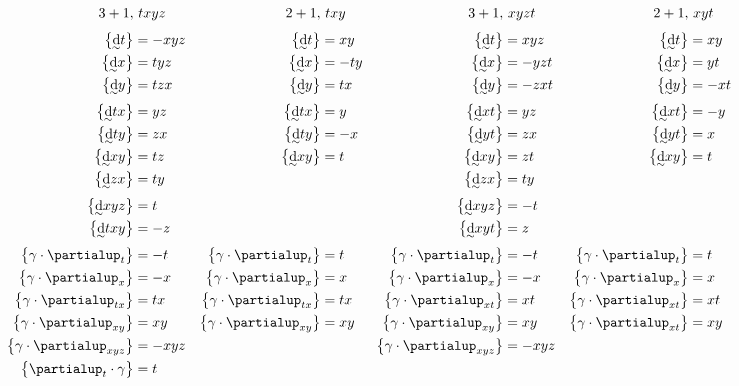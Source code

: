 \documentclass[\ifafour a4paper,12pt,\else a5paper,10pt,\fi%
onecolumn,oneside,article,%
british%
]{memoir}
\theoremstyle{remark}
\theoremstyle{innote}
\newcommand*{\de}{\partialup}%
\newcommand*{\di}{\mathrm{d}}%
\DeclarePairedDelimiter\set{\{}{\}} %
\renewcommand*{\|}[1][]{\nonscript\:#1\vert\nonscript\:\mathopen{}}
\newcommand*{\tw}[2][\scriptstyle\sim]{\smash[b]{\underset{\mathclap{{}^{#1}}}{#2}}}
\newcommand*{\ti}[1][\scriptstyle\sim]{\tw[#1]{\di}}
\begin{document}
\begin{equation}
  \label{eq:table_orientation}
  \begin{aligned}
    3+1,&\ txyz &    2+1,&\ txy &
    3+1,&\ xyzt &    2+1,&\ xyt 
\\[\jot]
    \set[\big]{\ti t} &= -xyz & \set[\big]{\ti t} &= xy &
    \set[\big]{\ti t} &= xyz & \set[\big]{\ti t} &= xy 
\\
    \set[\big]{\ti x} &= tyz & \set[\big]{\ti x} &= -ty &
    \set[\big]{\ti x} &= -yzt & \set[\big]{\ti x} &= yt 
\\
    \set[\big]{\ti y} &= tzx & \set[\big]{\ti y} &= tx &
    \set[\big]{\ti y} &= -zxt & \set[\big]{\ti y} &= -xt 
\\[\jot]
    \set[\big]{\ti tx} &= yz & \set[\big]{\ti tx} &= y &
    \set[\big]{\ti xt} &= yz & \set[\big]{\ti xt} &= -y 
\\
    \set[\big]{\ti ty} &= zx & \set[\big]{\ti ty} &= -x &
    \set[\big]{\ti yt} &= zx & \set[\big]{\ti yt} &= x 
\\
    \set[\big]{\ti xy } &= tz & \set[\big]{\ti xy } &= t &
    \set[\big]{\ti xy } &= zt & \set[\big]{\ti xy } &= t 
\\
    \set[\big]{\ti zx } &= ty & & &
    \set[\big]{\ti zx } &= ty & & 
\\[\jot]
    \set[\big]{\ti xyz}&=t & & &
    \set[\big]{\ti xyz}&=-t & & 
\\
    \set[\big]{\ti txy}&=-z & & &
    \set[\big]{\ti xyt}&=z & & 
\\[\jot]
    \set[\big]{\gamma\cdot\de_{t}} &= -t &
    \set[\big]{\gamma\cdot\de_{t}} &= t &
    \set[\big]{\gamma\cdot\de_{t}} &= -t &
    \set[\big]{\gamma\cdot\de_{t}} &= t 
\\
    \set[\big]{\gamma\cdot\de_{x}} &= -x &
    \set[\big]{\gamma\cdot\de_{x}} &= x &
    \set[\big]{\gamma\cdot\de_{x}} &= -x &
    \set[\big]{\gamma\cdot\de_{x}} &= x 
\\
    \set[\big]{\gamma\cdot\de_{tx}} &= tx &
    \set[\big]{\gamma\cdot\de_{tx}} &= tx &
    \set[\big]{\gamma\cdot\de_{xt}} &= xt &
    \set[\big]{\gamma\cdot\de_{xt}} &= xt 
\\
    \set[\big]{\gamma\cdot\de_{xy}} &= xy &
    \set[\big]{\gamma\cdot\de_{xy}} &= xy &
    \set[\big]{\gamma\cdot\de_{xy}} &= xy &
    \set[\big]{\gamma\cdot\de_{xt}} &= xy 
\\
    \set[\big]{\gamma\cdot\de_{xyz}} &= -xyz & & &
    \set[\big]{\gamma\cdot\de_{xyz}} &= -xyz & & 
\\
    \set[\big]{\de_{t}\cdot\gamma} &= t &

\end{aligned}
\end{equation}
\end{document}
